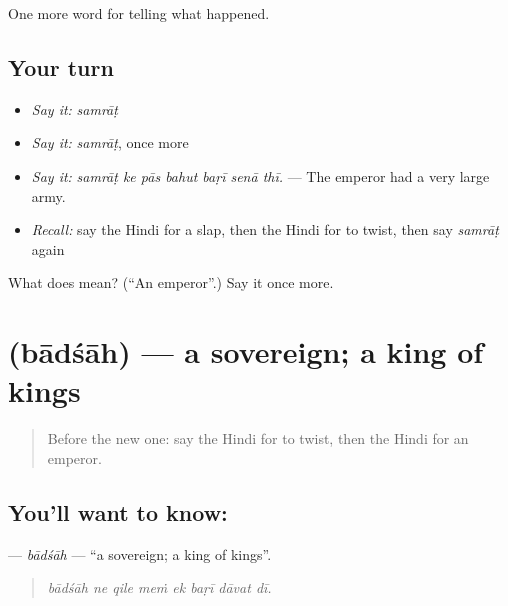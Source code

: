 \begin{grammarlens}[title={What you've built}]
One more word for telling what happened.
\end{grammarlens}

\subsection*{Your turn}
\begin{itemize}
\raggedright
  \item \emph{Say it:} \emph{samrāṭ}
  \item \emph{Say it:} \emph{samrāṭ}, once more
  \item \emph{Say it:} \emph{samrāṭ ke pās bahut baṛī senā thī.} — The emperor had a very large army.
  \item \emph{Recall:} say the Hindi for a slap, then the Hindi for to twist, then say \emph{samrāṭ} again
\end{itemize}

\begin{tcolorbox}[breakable,colback=teal!4,colframe=teal!35!black,title={Before you move on}]
What does  mean? (\textquotedblleft{}An emperor\textquotedblright{}.) Say it once more.
\end{tcolorbox}
\section[\texorpdfstring{\hi{बादशाह} (bādśāh)}{बादशाह (bādśāh)}]{ (bādśāh) — a sovereign; a king of kings}

\label{lesson:HI-C320-badsah}



\begin{quote}
Before the new one: say the Hindi for to twist, then the Hindi for an emperor.
\end{quote}

\subsection*{You'll want to know: }
\textbf{} — \emph{bādśāh} — \textquotedblleft{}a sovereign; a king of kings\textquotedblright{}.

\begin{quote}
       
\end{quote}

\begin{quote}
\emph{bādśāh ne qile meṁ ek baṛī dāvat dī.}
\end{quote}

